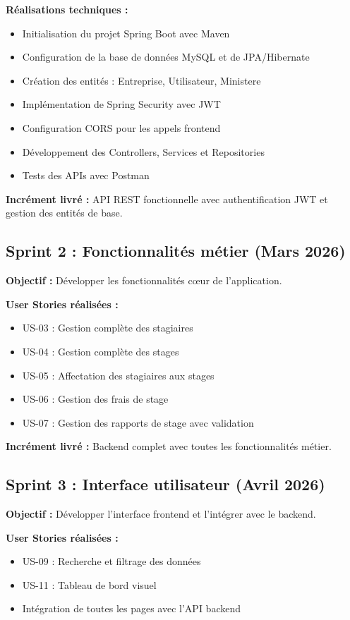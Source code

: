 \documentclass[12pt,a4paper]{report}
\begin{document}
\textbf{Réalisations techniques :}
\begin{itemize}[leftmargin=1cm]
    \item Initialisation du projet Spring Boot avec Maven
    \item Configuration de la base de données MySQL et de JPA/Hibernate
    \item Création des entités : Entreprise, Utilisateur, Ministere
    \item Implémentation de Spring Security avec JWT
    \item Configuration CORS pour les appels frontend
    \item Développement des Controllers, Services et Repositories
    \item Tests des APIs avec Postman
\end{itemize}

\textbf{Incrément livré :} API REST fonctionnelle avec authentification JWT et gestion des entités de base.

\subsection{Sprint 2 : Fonctionnalités métier (Mars 2026)}

\textbf{Objectif :} Développer les fonctionnalités cœur de l'application.

\textbf{User Stories réalisées :}
\begin{itemize}[leftmargin=1cm]
    \item US-03 : Gestion complète des stagiaires
    \item US-04 : Gestion complète des stages
    \item US-05 : Affectation des stagiaires aux stages
    \item US-06 : Gestion des frais de stage
    \item US-07 : Gestion des rapports de stage avec validation
\end{itemize}

\textbf{Incrément livré :} Backend complet avec toutes les fonctionnalités métier.

\subsection{Sprint 3 : Interface utilisateur (Avril 2026)}

\textbf{Objectif :} Développer l'interface frontend et l'intégrer avec le backend.

\textbf{User Stories réalisées :}
\begin{itemize}[leftmargin=1cm]
    \item US-09 : Recherche et filtrage des données
    \item US-11 : Tableau de bord visuel
    \item Intégration de toutes les pages avec l'API backend
\end{itemize}
\end{document}
